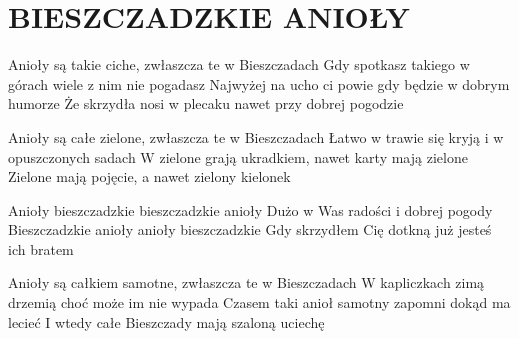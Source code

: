 \documentclass[../../../songbook.tex]{subfiles}
\begin{document}
\TabPositions{10cm} %
\section*{BIESZCZADZKIE ANIOŁY}
{}
\vspace{0.5cm}
Anioły są takie ciche, zwłaszcza te w Bieszczadach			 \newline
Gdy spotkasz takiego w górach wiele z nim nie pogadasz			 \newline
Najwyżej na ucho ci powie gdy będzie w dobrym humorze			 \newline
Że skrzydła nosi w plecaku nawet przy dobrej pogodzie			 \newline

Anioły są całe zielone, zwłaszcza te w Bieszczadach \newline
Łatwo w trawie się kryją i w opuszczonych sadach \newline
W zielone grają ukradkiem, nawet karty mają zielone \newline
Zielone mają pojęcie, a nawet zielony kielonek \newline

\-\hspace{1cm} Anioły bieszczadzkie bieszczadzkie anioły			 \newline
\-\hspace{1cm} Dużo w Was radości i dobrej pogody			 \newline
\-\hspace{1cm} Bieszczadzkie anioły anioły bieszczadzkie			 \newline
\-\hspace{1cm} Gdy skrzydłem Cię dotkną już jesteś ich bratem			 \newline

Anioły są całkiem samotne, zwłaszcza te w Bieszczadach \newline
W kapliczkach zimą drzemią choć może im nie wypada \newline
Czasem taki anioł samotny zapomni dokąd ma lecieć \newline
I wtedy całe Bieszczady mają szaloną uciechę \newline
\end{document}

